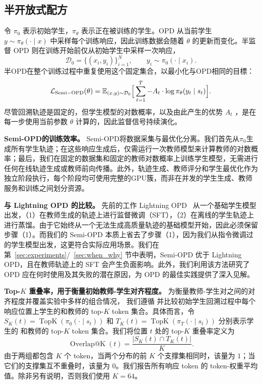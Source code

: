 \subsection{半开放式配方}
\label{sec:semi_opd_method}

令 $\pi_0$ 表示初始学生，$\pi_\theta$ 表示正在被训练的学生。OPD 从当前学生 $y \sim \pi_\theta(\cdot \mid x)$ 中采样每个训练响应，因此训练数据会随着 $\theta$ 的更新而变化。半监督 OPD 则在训练开始前仅从初始学生中采样一次响应，
\begin{equation}
  \mathcal{D}_0 = \{(x_i, y_i)\}_{i=1}^{N}, \qquad y_i \sim \pi_0(\cdot \mid x_i).
\end{equation}
半OPD在整个训练过程中重复使用这个固定集合，以最小化与OPD相同的目標：
\begin{equation}
  \mathcal{L}_{\mathrm{Semi-OPD}}(\theta)
  = \mathbb{E}_{(x,y) \sim \mathcal{D}_0}
  \Big[\sum_{t=1}^{T} -A_t \cdot \log \pi_\theta(y_t \mid s_t)\Big].
  \label{eq:semi-opd}
\end{equation}
尽管回溯轨迹是固定的，但学生模型的对数概率，以及由此产生的优势 $A_t$ ，是在每一步使用当前参数 $\theta$ 计算的，因此监督信号持续演化。



\noindent \textbf{Semi-OPD的训练效率。}
Semi-OPD将数据采集与最优化分离。我们首先从$\pi_0$生成所有学生轨迹；在这些响应生成后，仅需运行一次教师模型来计算教师的对数概率；最后，我们在固定的数据集和固定的教师对数概率上训练学生模型，无需进行任何在线轨迹生成或教师前向传播。此外，轨迹生成、教师评分和学生最优化作为独立阶段执行，每个阶段均可使用完整的GPU簇，而非在并发的学生生成、教师服务和训练之间划分资源。



\noindent \textbf{与 Lightning OPD 的比较。}  
先前的工作 Lightning OPD~\citep{wu2026lightning} 从一个基础学生模型出发，（1）在教师生成的轨迹上进行监督微调（SFT），（2）在离线的学生轨迹上进行蒸馏。由于它始终从一个无法生成高质量轨迹的基础模型开始，因此必须保留步骤（1）。而我们的 Semi-OPD 本质上省去了步骤（1），因为我们从指令微调过的学生模型出发，这更符合实际应用场景。我们在第~\ref{sec:experiments}/~\ref{sec:when_why} 节中表明，Semi-OPD 优于 Lightning OPD，且在教师轨迹上的 SFT 会产生负面影响。此外，我们利用该方法研究了 OPD 应在何时使用及其失败的潜在原因，为 OPD 的最佳实践提供了深入见解。

\vspace{-2mm}
\noindent \textbf{Top-$K$  重叠率，用于衡量初始教师-学生对齐程度。}
为衡量教师-学生对之间的对齐程度并覆盖实验中多样的组合情况，
我们遵循 \citep{li2026rethinking} 并比较初始学生回溯过程中每个响应位置上学生的和教师的
top-$K$  token 集合。具体而言，令   
$S_K(t) = \operatorname{TopK}(\pi_0(\cdot \mid s_t))$  和          
$T_K(t) = \operatorname{TopK}(\pi_T(\cdot \mid s_t))$  分别表示学生的   
和教师的 top-$K$  token 集合。我们将位置 $t$  处的 top-$K$  重叠率定义为
\[
\operatorname{Overlap@K}(t)
=
\frac{\left|S_K(t) \cap T_K(t)\right|}{K}.
\]
由于两组都包含 $K$ 个 token，当两个分布的前 $K$ 个支撑集相同时，该量为 $1$；当它们的支撑集互不重叠时，该量为 $0$。我们报告所有响应 token 的 token-权重平均值。除非另有说明，否则我们使用 $K=64$。
